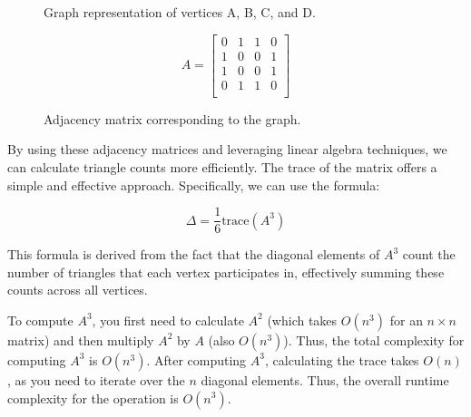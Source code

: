 \documentclass[12pt]{report}
\begin{document}
\begin{figure}[H]
    \centering
    \begin{minipage}{0.45\textwidth}
        \caption{Graph representation of vertices A, B, C, and D.}
    \end{minipage}%
    \hfill
    \begin{minipage}{0.45\textwidth}
        \[
        A =
        \begin{bmatrix}
        0 & 1 & 1 & 0 \\
        1 & 0 & 0 & 1 \\
        1 & 0 & 0 & 1 \\
        0 & 1 & 1 & 0 \\
        \end{bmatrix}
        \]
        \caption{Adjacency matrix corresponding to the graph.}
    \end{minipage}
\end{figure}

By using these adjacency matrices and leveraging linear algebra techniques, we can calculate triangle counts more efficiently. 
The trace of the matrix offers a simple and effective approach. Specifically, we can use the formula:

\[
\Delta = \frac{1}{6} \mathrm{trace}(A^3)
\]

This formula is derived from the fact that the diagonal elements of \(A^3\) count the number of triangles that each vertex participates in, effectively summing these counts across all vertices. 

To compute $A^3$, you first need to calculate $A^2$ (which takes $O(n^3)$ for an $n \times n$ matrix) and then multiply $A^2$ by $A$ (also $O(n^3)$).
Thus, the total complexity for computing $A^3$ is $O(n^3)$.
After computing $A^3$, calculating the trace takes $O(n)$, as you need to iterate over the $n$ diagonal elements.
Thus, the overall runtime complexity for the operation is $O(n^3)$.
\end{document}
